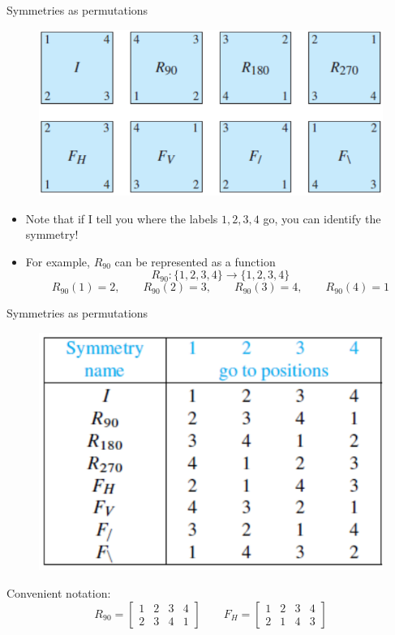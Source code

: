 \documentclass{beamer}
\def\itemb{\begin{itemize}}
\def\iteme{\end{itemize}}
\begin{document}
\begin{frame}{Symmetries as permutations}
\begin{figure}
\centering
\includegraphics[scale=0.8]{Allsymm.pdf}
\end{figure}\vspace{-0.2cm}
\itemb
\item Note that if I tell you where the labels $1,2,3,4$ go, you can identify the symmetry! 
\item For example, $R_{90}$ can be represented as a function 
\[
R_{90}:\{1,2,3,4\}\to\{1,2,3,4\}
\]
\[
R_{90}(1)=2,\qquad R_{90}(2)=3,\qquad R_{90}(3)=4,\qquad  R_{90}(4)=1
\]
\iteme

\end{frame}

\begin{frame}{Symmetries as permutations}
\begin{figure}
\centering
\includegraphics[scale=0.8]{Asperm.pdf}
\end{figure}
Convenient notation:
\[
R_{90}=\left[\begin{array}{cccc}
1&2&3&4\\
2&3&4&1
\end{array}\right]\qquad F_H=\left[\begin{array}{cccc}
1&2&3&4\\
2&1&4&3
\end{array}\right]
\]
\end{frame}
\end{document}
